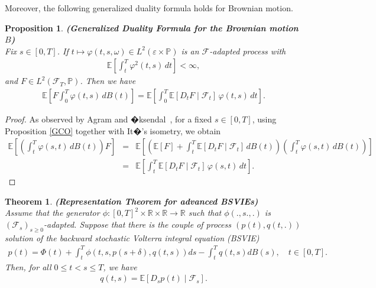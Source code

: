 \documentclass[12pt]{article}
\newtheorem{theorem}{Theorem}[section]
\newtheorem{proposition}{Proposition}[section]
\theoremstyle{remark}
\numberwithin{equation}{section}
\def\E{\mathbb E}
\def\E{\mathbb E}
\begin{document}
Moreover, the following generalized duality formula holds for Brownian motion.
\begin{proposition}
	\textbf{(Generalized Duality Formula for the Brownian motion \( B \))}\\
	Fix \( s \in [0, T] \).  
	If \( t \mapsto \varphi(t,s,\omega) \in L^2(\varepsilon \times \mathbb{P}) \) is an \( \mathcal{F} \)-adapted process with  
\begin{eqnarray*}
		\E \left[ \int_t^T \varphi^2(t,s) \, dt \right] < \infty ,
\end{eqnarray*}
and $ F \in L^2(\mathcal{F}_T, \mathbb{P})$. Then we have
	\begin{eqnarray}\label{dd}
		\mathbb{E} \left[ F \int_0^T \varphi(t,s) \, dB(t) \right] 
		= \mathbb{E} \left[ \int_0^T \mathbb{E}[D_t F \mid \mathcal{F}_t] \, \varphi(t,s) \, dt \right].
	\end{eqnarray}
\end{proposition}
\begin{proof}
As observed by Agram and �ksendal~\cite{Agram2015}, for a fixed $s \in [0, T]$, using Proposition \ref{GCO} together with It�'s isometry, we obtain
\begin{eqnarray*}
\mathbb{E} \left[ \left( \int_t^T \varphi(s,t) \, dB(t) \right) F \right] 
		&=& \mathbb{E} \left[ \left( \mathbb{E}[F] + \int_t^T \mathbb{E}[D_t F \mid \mathcal{F}_t] \, dB(t) \right) \left( \int_t^T \varphi(s,t) \, dB(t) \right) \right] \\
		&=& \mathbb{E} \left[ \int_t^T \mathbb{E}[D_t F \mid \mathcal{F}_t] \, \varphi(s,t) \, dt \right].
\end{eqnarray*}
\end{proof}
\begin{theorem}\textbf{(Representation Theorem for advanced BSVIEs)}\label{TRep}\\
	Assume that the generator $\phi: [0, T]^2\times\mathbb{R}\times\mathbb{R}\to \mathbb{R}$ such that $\phi(.,s.,.)$ is $(\mathcal{F}_s)_{s\geq 0}$-adapted. Suppose that there is the couple of process $(p(t), q(t, .))$ solution of  the backward stochastic Volterra integral equation (BSVIE) 
\begin{eqnarray*}
	p(t) = \Phi(t) + \int_t^T \phi(t, s, p(s+\delta), q(t, s))ds 
		- \int_t^T q(t, s)dB(s), \quad t \in [0, T].	
\end{eqnarray*}  
Then, for all $0\leq t<s\leq T$, we have 
\begin{eqnarray}\label{e1}
q(t, s) = \mathbb{E}\left[ D_s p(t) \mid \mathcal{F}_s \right].
\end{eqnarray}
\end{theorem}
\end{document}
